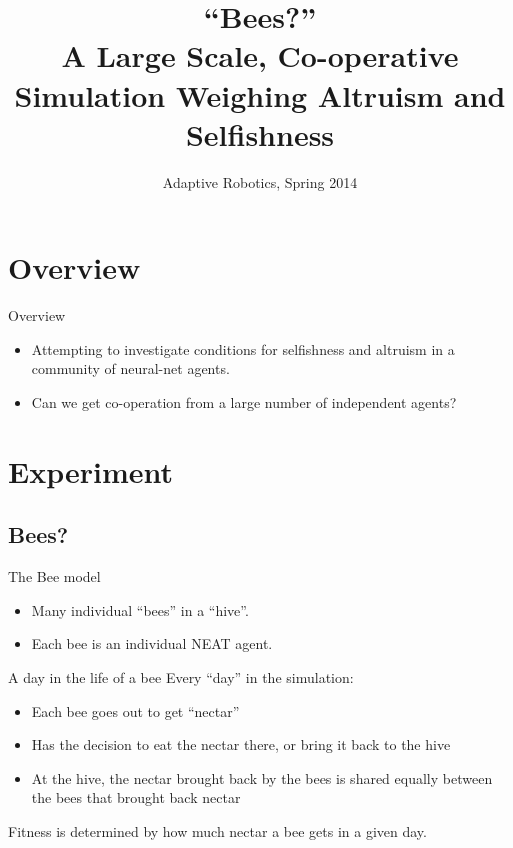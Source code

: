 \documentclass{beamer}
\title[Bees?]{``Bees?''\\ A Large Scale, Co-operative Simulation Weighing
                          Altruism and Selfishness}
\institute{Swarthmore College}
\date{Adaptive Robotics, Spring 2014}
\begin{document}
    \begin{frame}
        \titlepage
    \end{frame}

    \begin{frame}
        \tableofcontents
    \end{frame}


    \section{Overview}

    \begin{frame}{Overview}
        \begin{itemize}
            \item Attempting to investigate conditions for selfishness and altruism in a community
                  of neural-net agents.
            \item Can we get co-operation from a large number of independent agents?
        \end{itemize}
    \end{frame}

    \section{Experiment}

    \subsection{Bees?}
    \begin{frame}{The Bee model}
        \begin{itemize}
            \item Many individual ``bees'' in a ``hive''.
            \item Each bee is an individual NEAT agent.
        \end{itemize}
    \end{frame}

    \begin{frame}{A day in the life of a bee}
        Every ``day'' in the simulation:
        \begin{itemize}
            \item Each bee goes out to get ``nectar''
            \item Has the decision to eat the nectar there, or bring it back to the hive
            \item At the hive, the nectar brought back by the bees is shared equally between 
                  the bees that brought back nectar
        \end{itemize}
        Fitness is determined by how much nectar a bee gets in a given day.
    \end{frame}
\end{document}
